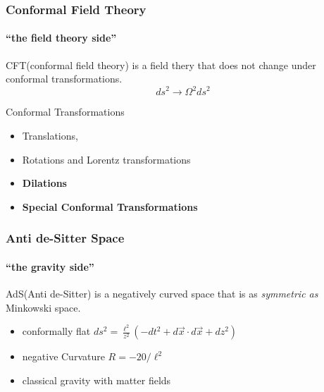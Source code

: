 \documentclass[aspectratio=169, xcolor=dvipsnames]{beamer}
\begin{document}
\begin{frame}
  \frametitle{Conformal Field Theory}
  \framesubtitle{``the field theory side''}
  \begin{block}{}
    \alert{CFT}(conformal field theory) is a field thery that does not change under conformal transformations.
    $${ds}^2 \rightarrow \Omega^2 {ds}^2$$
  \end{block}

  \begin{block}{Conformal Transformations}
    \begin{itemize}
      \item Translations, 
      \item Rotations and Lorentz transformations
      \item \textbf{Dilations}
      \item \textbf{Special Conformal Transformations}
    \end{itemize}
  \end{block}

\end{frame}

\begin{frame}
  \frametitle{Anti de-Sitter Space}
  \framesubtitle{``the gravity side''}

  \begin{block}{}
    \alert{AdS}(Anti de-Sitter) is a negatively curved space that is as \textit{symmetric as} Minkowski space.
  \end{block}

  \begin{itemize}
    \item conformally flat 
      $ds^2 = \frac {\ell^2}{z^2} \left( -dt^2 + d\vec x\cdot d\vec x + dz^2 \right)$
    \item negative Curvature 
      $R = -20/\ell^2$
    \item classical gravity with matter fields
  \end{itemize}


\end{frame}

\end{document}
